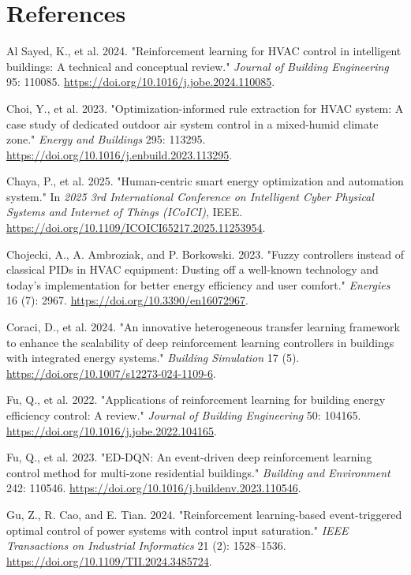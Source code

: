 \documentclass[preprint,12pt]{elsarticle}
\newenvironment{reflist}{%
  \begin{list}{}{%
    \setlength{\leftmargin}{2.2em}%
    \setlength{\itemindent}{-2.2em}%
    \setlength{\itemsep}{2pt}%
    \setlength{\parsep}{0pt}%
  }%
  \raggedright
}{%
  \end{list}
}
\begin{document}
\section*{References}
\begin{reflist}
\item Al Sayed, K., et al. 2024. "Reinforcement learning for HVAC control in intelligent buildings: A technical and conceptual review." \textit{Journal of Building Engineering} 95: 110085. \url{https://doi.org/10.1016/j.jobe.2024.110085}.
\item Choi, Y., et al. 2023. "Optimization-informed rule extraction for HVAC system: A case study of dedicated outdoor air system control in a mixed-humid climate zone." \textit{Energy and Buildings} 295: 113295. \url{https://doi.org/10.1016/j.enbuild.2023.113295}.
\item Chaya, P., et al. 2025. "Human-centric smart energy optimization and automation system." In \textit{2025 3rd International Conference on Intelligent Cyber Physical Systems and Internet of Things (ICoICI)}, IEEE. \url{https://doi.org/10.1109/ICOICI65217.2025.11253954}.
\item Chojecki, A., A. Ambroziak, and P. Borkowski. 2023. "Fuzzy controllers instead of classical PIDs in HVAC equipment: Dusting off a well-known technology and today's implementation for better energy efficiency and user comfort." \textit{Energies} 16 (7): 2967. \url{https://doi.org/10.3390/en16072967}.
\item Coraci, D., et al. 2024. "An innovative heterogeneous transfer learning framework to enhance the scalability of deep reinforcement learning controllers in buildings with integrated energy systems." \textit{Building Simulation} 17 (5). \url{https://doi.org/10.1007/s12273-024-1109-6}.
\item Fu, Q., et al. 2022. "Applications of reinforcement learning for building energy efficiency control: A review." \textit{Journal of Building Engineering} 50: 104165. \url{https://doi.org/10.1016/j.jobe.2022.104165}.
\item Fu, Q., et al. 2023. "ED-DQN: An event-driven deep reinforcement learning control method for multi-zone residential buildings." \textit{Building and Environment} 242: 110546. \url{https://doi.org/10.1016/j.buildenv.2023.110546}.
\item Gu, Z., R. Cao, and E. Tian. 2024. "Reinforcement learning-based event-triggered optimal control of power systems with control input saturation." \textit{IEEE Transactions on Industrial Informatics} 21 (2): 1528--1536. \url{https://doi.org/10.1109/TII.2024.3485724}.

\end{reflist}
\end{document}
